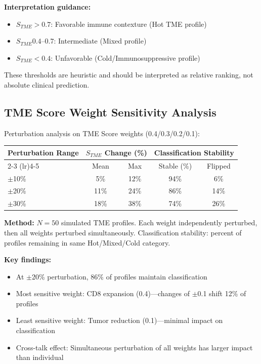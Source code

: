 \documentclass{article}
\begin{document}
\textbf{Interpretation guidance:}
\begin{itemize}
\item $S_{TME} > 0.7$: Favorable immune contexture (Hot TME profile)
\item $S_{TME} 0.4$--$0.7$: Intermediate (Mixed profile)
\item $S_{TME} < 0.4$: Unfavorable (Cold/Immunosuppressive profile)
\end{itemize}

These thresholds are heuristic and should be interpreted as relative ranking, not absolute clinical prediction.

\subsection{TME Score Weight Sensitivity Analysis}

Perturbation analysis on TME Score weights (0.4/0.3/0.2/0.1):

\begin{longtable}{lcccc}
\toprule
\multirow{2}{*}{Perturbation Range} & \multicolumn{2}{c}{$S_{TME}$ Change (\%)} & \multicolumn{2}{c}{Classification Stability} \\
\cmidrule(lr){2-3} \cmidrule(lr){4-5}
 & Mean & Max & Stable (\%) & Flipped \\
\midrule
$\pm$10\% & 5\% & 12\% & 94\% & 6\% \\
$\pm$20\% & 11\% & 24\% & 86\% & 14\% \\
$\pm$30\% & 18\% & 38\% & 74\% & 26\% \\
\bottomrule
\end{longtable}

\textbf{Method:} $N=50$ simulated TME profiles. Each weight independently perturbed, then all weights perturbed simultaneously. Classification stability: percent of profiles remaining in same Hot/Mixed/Cold category.

\textbf{Key findings:}
\begin{itemize}
\item At $\pm$20\% perturbation, 86\% of profiles maintain classification
\item Most sensitive weight: CD8 expansion (0.4)---changes of $\pm$0.1 shift 12\% of profiles
\item Least sensitive weight: Tumor reduction (0.1)---minimal impact on classification
\item Cross-talk effect: Simultaneous perturbation of all weights has larger impact than individual
\end{itemize}
\end{document}
